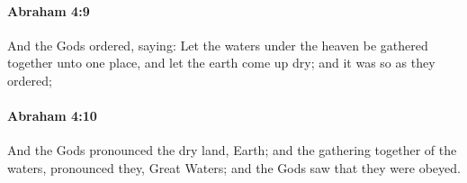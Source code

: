 
		\paragraph{Abraham 4:9} %
			\label{ABRAHAM-4-9}

			And the Gods ordered, saying: Let the waters under the heaven be gathered together unto one place, and let the earth come up dry; and it was so as they ordered;


		\paragraph{Abraham 4:10} %
			\label{ABRAHAM-4-10}

			And the Gods pronounced the dry land, Earth; and the gathering together of the waters, pronounced they, Great Waters; and the Gods saw that they were obeyed.


